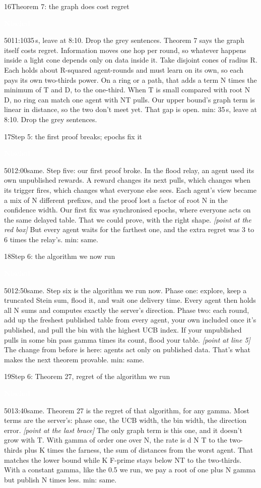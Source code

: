 \documentclass[12pt,a4paper]{article}
\newcommand{\Nb}{\colorbox{nisch}{\strut\textcolor{white}{\textbf{\small Nischal}}}}
\newcommand{\cut}[1]{\textcolor{cutc}{#1}}
\newcommand{\cue}[1]{{\small\itshape\color{bar}[#1]}}
\newenvironment{slide}[6]
  {\begin{slidebox}{#1}{#2}{#3}{#4}{#5}{#6}\gdef\fifteen{#6}}
  {\tcblower 15 min: \fifteen\end{slidebox}}
\begin{document}
\begin{slide}{16}{Theorem 7: the graph does cost regret}{\Nb}{50}{11:10}{35\,s, leave at 8:10. Drop the grey sentences.}
Theorem 7 says the graph itself costs regret. Information moves one hop per round, so whatever happens inside a light
cone depends only on data inside it. \cut{Take disjoint cones of radius R. Each holds about R-squared agent-rounds and
must learn on its own, so each pays its own two-thirds power.} On a ring or a path, that adds a term N times the
minimum of T and D, to the one-third. \cut{When T is small compared with root N D, no ring can match one agent with
NT pulls.} Our upper bound's graph term is linear in distance, so the two don't meet yet. That gap is open.
\end{slide}

\begin{slide}{17}{Step 5: the first proof breaks; epochs fix it}{\Nb}{50}{12:00}{same.}
Step five: our first proof broke. In the flood relay, an agent used its own unpublished rewards. A reward changes its
next pulls, which changes when its trigger fires, which changes what everyone else sees. Each agent's view became a
mix of N different prefixes, and the proof lost a factor of root N in the confidence width. Our first fix was
synchronised epochs, where everyone acts on the same delayed table. That we could prove, with the right shape.
\cue{point at the red box} But every agent waits for the farthest one, and the extra regret was 3 to 6 times the
relay's.
\end{slide}

\begin{slide}{18}{Step 6: the algorithm we now run}{\Nb}{50}{12:50}{same.}
Step six is the algorithm we run now. Phase one: explore, keep a truncated Stein sum, flood it, and wait one delivery
time. Every agent then holds all N sums and computes exactly the server's direction. Phase two: each round, add up the
freshest published table from every agent, your own included once it's published, and pull the bin with the highest
UCB index. If your unpublished pulls in some bin pass gamma times its count, flood your table. \cue{point at line 5}
The change from before is here: agents act only on published data. That's what makes the next theorem provable.
\end{slide}

\begin{slide}{19}{Step 6: Theorem 27, regret of the algorithm we run}{\Nb}{50}{13:40}{same.}
Theorem 27 is the regret of that algorithm, for any gamma. Most terms are the server's: phase one, the UCB width, the
bin width, the direction error. \cue{point at the last brace} The only graph term is this one, and it doesn't grow
with T. With gamma of order one over N, the rate is d N T to the two-thirds plus K times the farness, the sum of
distances from the worst agent. That matches the lower bound while K F-prime stays below NT to the two-thirds. With a
constant gamma, like the 0.5 we run, we pay a root of one plus N gamma but publish N times less.
\end{slide}
\end{document}
